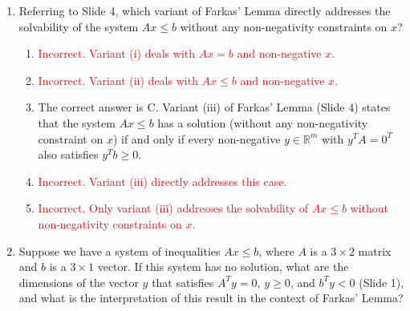 \documentclass{article}%
\newcommand{\incorrect}[1]{\textcolor{red}{#1}}
\begin{document}
\begin{enumerate}
\begin{enumerate}%
\item \incorrect{Incorrect.  $y$ must have 5 entries to make $y^T A$ a valid matrix multiplication.}%
\item \incorrect{Incorrect. This is not a valid matrix dimension for the product $y^T A$ to be defined.}%
\item The correct answer is C.  Farkas' Lemma (Slide 2) states that if $Ax = b$ has no non-negative solution, then there exists a vector $y$ such that $y^T A \ge 0^T$ and $y^T b < 0$. Since $A$ is a $5 \times 3$ matrix, $y^T$ must be a $1 \times 5$ row vector for the product $y^T A$ to be defined. Therefore, $y$ is a $5 \times 1$ column vector.%
\item \incorrect{Incorrect. This is not a valid matrix dimension for the product $y^T A$ to be defined.}%
\item \incorrect{Incorrect. The dimension of $y$ is determined by the requirement that $y^T A$ be a valid matrix product.}%
\end{enumerate}%
\vspace{1em}%
\item Referring to Slide 4, which variant of Farkas' Lemma directly addresses the solvability of the system $Ax \le b$ without any non-negativity constraints on $x$?%
\begin{enumerate}%
\item \incorrect{Incorrect. Variant (i) deals with $Ax = b$ and non-negative $x$.}%
\item \incorrect{Incorrect. Variant (ii) deals with $Ax \le b$ and non-negative $x$.}%
\item The correct answer is C. Variant (iii) of Farkas' Lemma (Slide 4) states that the system $Ax \le b$ has a solution (without any non-negativity constraint on $x$) if and only if every non-negative $y \in \mathbb{R}^m$ with $y^T A = 0^T$ also satisfies $y^T b \ge 0$.%
\item \incorrect{Incorrect. Variant (iii) directly addresses this case.}%
\item \incorrect{Incorrect. Only variant (iii) addresses the solvability of $Ax \le b$ without non-negativity constraints on $x$.}%
\end{enumerate}%
\vspace{1em}%
\item Suppose we have a system of inequalities $Ax \le b$, where $A$ is a $3 \times 2$ matrix and $b$ is a $3 \times 1$ vector.  If this system has no solution, what are the dimensions of the vector $y$ that satisfies $A^T y = 0$, $y \ge 0$, and $b^T y < 0$ (Slide 1), and what is the interpretation of this result in the context of Farkas' Lemma?%

\end{enumerate}
\end{document}
